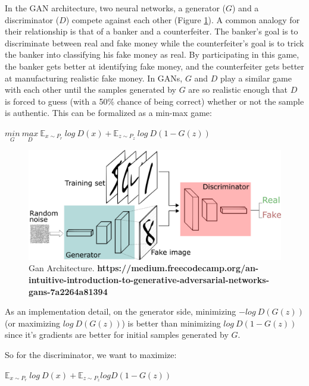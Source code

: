 \documentclass{article}
\begin{document}
In the GAN architecture, two neural networks, a generator ($G$) and a discriminator ($D$) compete against each other (Figure \ref{fig:gan}). A common analogy for their relationship is that of a banker and a counterfeiter. The banker's goal is to discriminate between real and fake money while the counterfeiter's goal is to trick the banker into classifying his fake money as real. By participating in this game, the banker gets better at identifying fake money, and the counterfeiter gets better at manufacturing realistic fake money. In GANs, $G$ and $D$ play a similar game with each other until the samples generated by $G$ are so realistic enough that $D$ is forced to guess (with a 50\% chance of being correct) whether or not the sample is authentic. This can be formalized as a min-max game:

\begin{center}
	$\underset{G}{min}~\underset{D}{max}~\mathbb{E}_{x \sim P_r}~log~D(x) + \mathbb{E}_{z \sim P_z}~log~D(1-G(z))$
\end{center}

\begin{figure}[h!]
	\centering
	\includegraphics[width=\linewidth]{media/gan.png}
	\caption{Gan Architecture.  \textbf{https://medium.freecodecamp.org/an-intuitive-introduction-to-generative-adversarial-networks-gans-7a2264a81394}}
	\label{fig:gan}
\end{figure}

As an implementation detail, on the generator side, minimizing $-log~D(G(z))$ (or maximizing $log~D(G(z))$) is better than minimizing $log~D(1-G(z))$ since it's gradients are better for initial samples generated by $G$.

So for the discriminator, we want to maximize:

\begin{center}
	$\mathbb{E}_{x \sim P_r}~log~D(x) + \mathbb{E}_{z \sim P_z} log D(1-G(z))$
\end{center}
\end{document}

